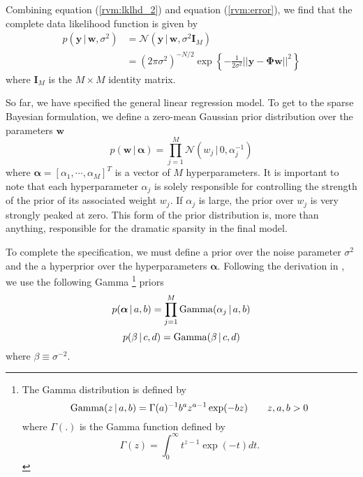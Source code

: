 Combining equation (\ref{rvm:lklhd_2}) and equation (\ref{rvm:error}), we find that the complete data likelihood function is given by
\begin{equation}
  \label{rvm:complete_lk}
  \begin{split}
    p\left(\bm y\,|\,\bm w,\sigma^2\right) &= \mathcal{N}\left(\bm y\,|\,\bm w,\sigma^2 \bm I_M\right)\\
    &= (2\pi\sigma^2)^{-N/2} \exp\left\{-\frac{1}{2\sigma^2}||\bm y - \bm\Phi\bm w||^2\right\}
  \end{split}
\end{equation}
where $\bm I_M$ is the $M\times M$ identity matrix.

So far, we have specified the general linear regression model.
To get to the sparse Bayesian formulation, we define a zero-mean Gaussian prior distribution over the parameters $\bm w$
\begin{equation}
\label{eqn:prior_w}
  p(\bm w\,|\,\bm \alpha) = \prod_{j=1}^M \mathcal{N}\left(w_j\,|\,0,\alpha_j^{-1}\right)
\end{equation}
where $\bm \alpha = \left[\alpha_1,\cdots,\alpha_M\right]^T$ is a vector of $M$ hyperparameters.
It is important to note that each hyperparameter $\alpha_j$ is solely responsible for controlling the strength of the prior of its associated weight $w_j$.
If $\alpha_j$ is large, the prior over $w_j$ is very strongly peaked at zero.
This form of the prior distribution is, more than anything, responsible for the dramatic sparsity in the final model.

To complete the specification, we must define a prior over the noise parameter $\sigma^2$ and the a hyperprior over the hyperparameters $\bm \alpha$.
Following the derivation in \cite{tipping2001}, we use the following Gamma
\footnote{
The Gamma distribution is defined by   
\[
\operatorname*{Gamma}(z\,|\,a,b) = \Gamma(a)^{-1} b^a z^{a-1} \exp(-bz)  \qquad z,a,b > 0
\]
where $\Gamma(.)$ is the Gamma function defined by 
\[
\Gamma(z) = \int_0^\infty t^{z-1} \exp(-t) dt.
\]
} priors
\begin{equation}
\label{eqn:prior_alpha}
  p(\bm\alpha\,|\,a,b) = \prod_{j=1}^M \operatorname*{Gamma}(\alpha_j\,|\,a,b)
\end{equation}
\begin{equation}
\label{eqn:prior_beta}
  p(\beta\,|\,c,d) = \operatorname*{Gamma}(\beta\,|\,c,d)
\end{equation}
where $\beta \equiv \sigma^{-2}$.

